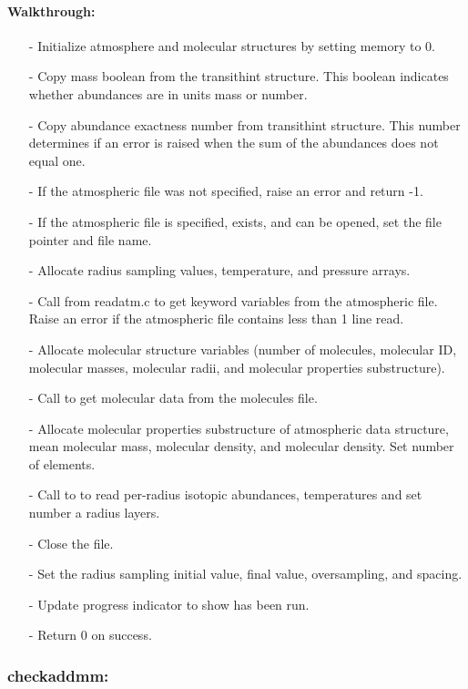 \documentclass[letterpaper,12pt]{article}
\begin{document}
\paragraph{Walkthrough:}
\begin{enumerate}[leftmargin=10pt, noitemsep, parsep=0pt, topsep=0ex]
\item[-] Initialize atmosphere and molecular structures by setting memory to 0.
\item[-] Copy mass boolean from the transithint structure. This boolean indicates whether abundances are in units mass or number.
\item[-] Copy abundance exactness number from transithint structure. This number determines if an error is raised when the sum of the abundances does not equal one.
\item[-] If the atmospheric file was not specified, raise an error and return -1.
\item[-] If the atmospheric file is specified, exists, and can be opened, set the file pointer and file name.
\item[-] Allocate radius sampling values, temperature, and pressure arrays.
\item[-] Call  from readatm.c to get keyword variables from the atmospheric file. Raise an error if the atmospheric file contains less than 1 line read.
\item[-] Allocate molecular structure variables (number of molecules, molecular ID, molecular masses, molecular radii, and molecular properties substructure).
\item[-] Call  to get molecular data from the molecules file.
\item[-] Allocate molecular properties substructure of atmospheric data structure, mean molecular mass, molecular density, and molecular density. Set number of elements.
\item[-] Call to  to read per-radius isotopic abundances, temperatures and set number a radius layers.
\item[-] Close the file.
\item[-] Set the radius sampling initial value, final value, oversampling, and spacing.
\item[-] Update progress indicator to show  has been run.
\item[-] Return 0 on success.
\end{enumerate}

\subsubsection{checkaddmm:}
\end{document}
